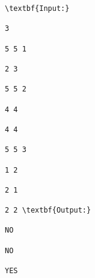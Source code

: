 \begin{verbatim}
\textbf{Input:}

3 

5 5 1 

2 3 

5 5 2 

4 4 

4 4 

5 5 3 

1 2 

2 1 

2 2 \textbf{Output:}

NO 

NO 

YES \end{verbatim}